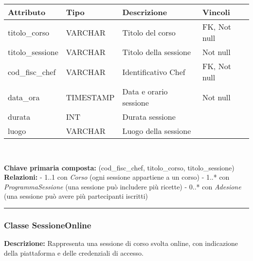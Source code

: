\documentclass[a4paper, 12pt]{article}
\begin{document}
        {
        \vspace{1em}
        \renewcommand{\arraystretch}{1.3}
        \begin{tabularx}{\textwidth}{|l|l|X|l|}
        \hline
        \textbf{Attributo} & \textbf{Tipo} & \textbf{Descrizione} & \textbf{Vincoli} \\
        \hline
        titolo\_corso    & VARCHAR      & Titolo del corso & FK, Not null \\
        titolo\_sessione & VARCHAR      & Titolo della sessione & Not null \\
        cod\_fisc\_chef  & VARCHAR      & Identificativo Chef & FK, Not null \\
        data\_ora        & TIMESTAMP    & Data e orario sessione & Not null \\
        durata           & INT          & Durata sessione & \\
        luogo            & VARCHAR      & Luogo della sessione & \\
        \hline
        \end{tabularx}\\[0.5em]
        }
        
        \noindent\textbf{Chiave primaria composta:} (cod\_fisc\_chef, titolo\_corso, titolo\_sessione)\\[0.1em]
        
        \noindent\textbf{Relazioni:}  
        - 1..1 con \textit{Corso} (ogni sessione appartiene a un corso)  
        - 1..* con \textit{ProgrammaSessione} (una sessione può includere più ricette)  
        - 0..* con \textit{Adesione} (una sessione può avere più partecipanti iscritti)

    \noindent\rule{\textwidth}{0.1pt}

    \subsubsection*{Classe SessioneOnline}
        \textbf{Descrizione:} Rappresenta una sessione di corso svolta online, con indicazione della piattaforma e delle credenziali di accesso.
        
\end{document}
